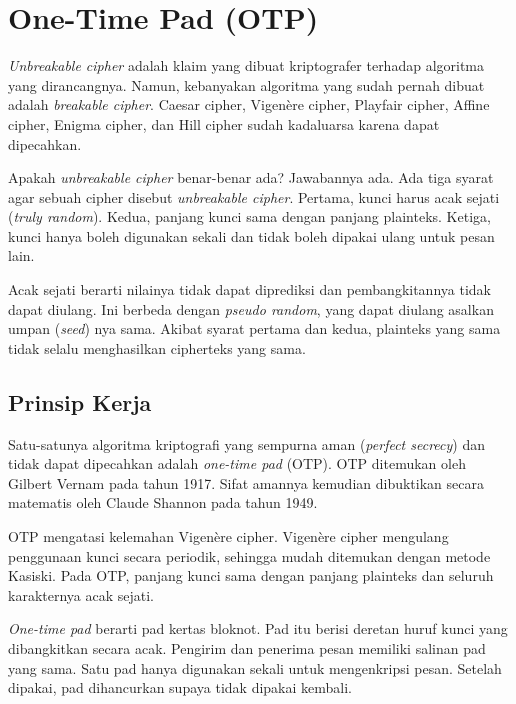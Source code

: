 \documentclass[../../main.tex]{subfiles}
\begin{document}
\section{One-Time Pad (OTP)}
\label{sec:otp}

\textit{Unbreakable cipher} adalah klaim yang dibuat kriptografer terhadap
algoritma yang dirancangnya. Namun, kebanyakan algoritma yang sudah pernah
dibuat adalah \textit{breakable cipher}. Caesar cipher, Vigen\`ere cipher,
Playfair cipher, Affine cipher, Enigma cipher, dan Hill cipher sudah
kadaluarsa karena dapat dipecahkan.

Apakah \textit{unbreakable cipher} benar-benar ada? Jawabannya ada. Ada tiga
syarat agar sebuah cipher disebut \textit{unbreakable cipher}. Pertama, kunci
harus acak sejati (\textit{truly random}). Kedua, panjang kunci sama dengan
panjang plainteks. Ketiga, kunci hanya boleh digunakan sekali dan tidak boleh
dipakai ulang untuk pesan lain.

Acak sejati berarti nilainya tidak dapat diprediksi dan pembangkitannya tidak
dapat diulang. Ini berbeda dengan \textit{pseudo random}, yang dapat diulang
asalkan umpan (\textit{seed}) nya sama. Akibat syarat pertama dan kedua,
plainteks yang sama tidak selalu menghasilkan cipherteks yang sama.

\subsection{Prinsip Kerja}
\label{sec:otp-prinsip}

Satu-satunya algoritma kriptografi yang sempurna aman (\textit{perfect
secrecy}) dan tidak dapat dipecahkan adalah \textit{one-time pad} (OTP). OTP
ditemukan oleh Gilbert Vernam pada tahun 1917. Sifat amannya kemudian
dibuktikan secara matematis oleh Claude Shannon pada tahun 1949.

OTP mengatasi kelemahan Vigen\`ere cipher. Vigen\`ere cipher mengulang
penggunaan kunci secara periodik, sehingga mudah ditemukan dengan metode
Kasiski. Pada OTP, panjang kunci sama dengan panjang plainteks dan seluruh
karakternya acak sejati.

\textit{One-time pad} berarti pad kertas bloknot. Pad itu berisi deretan huruf
kunci yang dibangkitkan secara acak. Pengirim dan penerima pesan memiliki
salinan pad yang sama. Satu pad hanya digunakan sekali untuk mengenkripsi
pesan. Setelah dipakai, pad dihancurkan supaya tidak dipakai kembali.
\end{document}

